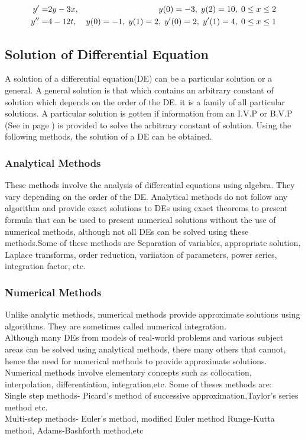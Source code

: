 \documentclass[12pt]{report}
\begin{document}
	\begin{eqnarray}
	y' =& 2y -3x,& y(0) = -3,\hspace{1mm} y(2) = 10,\hspace{1mm} 0\leq x\leq 2\\
	y'' =& 4 - 12t,& y(0) = -1,\hspace{1mm} y(1) =2,\hspace{1mm} y'(0) = 2,\hspace{1mm} y'(1) = 4,\hspace{1mm} 0\leq x\leq 1
	\end{eqnarray}
	
	\smallskip
	\subsection{Solution of Differential Equation}
	A solution of a differential equation(DE) can be a particular solution or a general. 
	A general solution is that which contains an arbitrary constant of solution which depends on the order of the DE. it is a family of all particular solutions. A particular solution is gotten if information from an I.V.P or B.V.P (See in page \pageref{sec: Problems of ODE}) is provided to solve the arbitrary constant of solution. Using the following methods, the solution of a DE can be obtained.
	\subsubsection{Analytical Methods}
	These methods involve the analysis of differential equations using algebra. They vary depending on the order of the DE. Analytical methods do not follow any algorithm and provide exact solutions to DEs using exact theorems to present formula that can be used to present numerical solutions without the use of numerical methods, although not all DEs can be solved using these methods.Some of these methods are Separation of variables, appropriate solution, Laplace transforms, order reduction, variiation of parameters, power series, integration factor, etc.
	\subsubsection{Numerical Methods}
	Unlike analytic methods, numerical methods provide approximate solutions using algorithms. They are sometimes called numerical integration. \\ Although many DEs from models of real-world problems and various subject areas can be solved using analytical methods, there many others that cannot, hence the need for numerical methods to provide approximate solutions.\\ Numerical methods involve elementary concepts such as collocation, interpolation, differentiation, integration,etc. Some of theses methods are:\\
Single step methods-  Picard's method of successive approximation,Taylor's series method etc. \\
Multi-step methods- Euler's method, modified Euler method Runge-Kutta method, Adams-Bashforth method,etc\\
	\medskip
\end{document}
